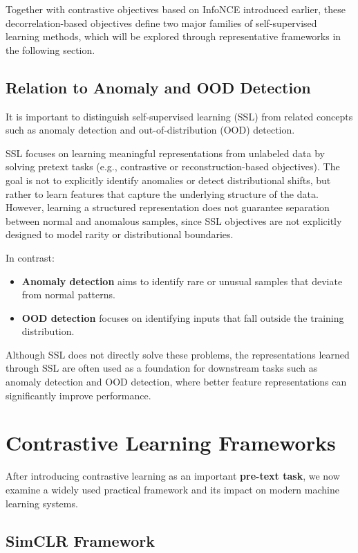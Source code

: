 \documentclass{article}
\begin{document}
Together with contrastive objectives based on InfoNCE introduced earlier, these decorrelation-based objectives define two major families of self-supervised learning methods, which will be explored through representative frameworks in the following section.

\subsection{Relation to Anomaly and OOD Detection}

It is important to distinguish self-supervised learning (SSL) from related concepts such as anomaly detection and out-of-distribution (OOD) detection.

SSL focuses on learning meaningful representations from unlabeled data by solving pretext tasks (e.g., contrastive or reconstruction-based objectives). The goal is not to explicitly identify anomalies or detect distributional shifts, but rather to learn features that capture the underlying structure of the data. However, learning a structured representation does not guarantee separation between normal and anomalous samples, since SSL objectives are not explicitly designed to model rarity or distributional boundaries.

In contrast:
\begin{itemize}
    \item \textbf{Anomaly detection} aims to identify rare or unusual samples that deviate from normal patterns.
    \item \textbf{OOD detection} focuses on identifying inputs that fall outside the training distribution.
\end{itemize}

Although SSL does not directly solve these problems, the representations learned through SSL are often used as a foundation for downstream tasks such as anomaly detection and OOD detection, where better feature representations can significantly improve performance.

\section{Contrastive Learning Frameworks}

After introducing contrastive learning as an important \textbf{pre-text task}, we now examine a widely used practical framework and its impact on modern machine learning systems.

\subsection{SimCLR Framework}
\end{document}
